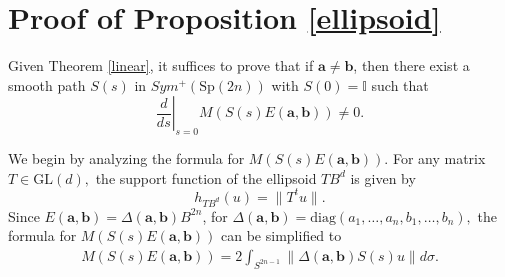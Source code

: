 \documentclass[12pt]{amsart}
\theoremstyle{definition}
\newcommand{\II}{{\mathbb I}}
\begin{document}
\section{Proof of Proposition \ref{ellipsoid}}\label{sec:ellipsoid}


Given Theorem \ref{linear}, it suffices to prove that if $\mathbf{a} \neq \mathbf{b}$, then there exist a smooth path $S(s)$ in $Sym^+(\mathrm{Sp}(2n))$ with $S(0) = \II$ such that $$\left.\frac{d}{ds}\right|_{s=0} M(S(s) E(\mathbf{a},\mathbf{b})) \neq 0.$$



We begin by analyzing the formula for $M(S(s) E(\mathbf{a},\mathbf{b}))$.
For any matrix $T \in \mathrm{GL}(d),$ the support function of the ellipsoid $TB^d$ is given by $$h_{TB^d}(u) = \|T^t u\|.$$ Since $E(\mathbf{a},\mathbf{b}) = \Delta(\mathbf{a}, \mathbf{b})B^{2n}$, for $\Delta(\mathbf{a}, \mathbf{b}) = \mathrm{diag}(a_1, \dots, a_n, b_1, \dots, b_n),$ the formula for $M(S(s) E(\mathbf{a},\mathbf{b}))$ can be simplified to 
\begin{align*}
   M(S(s) E(\mathbf{a},\mathbf{b}))  = 2\int_{S^{2n-1}} \|\Delta(\mathbf{a}, \mathbf{b}) S(s) u\| d\sigma.
\end{align*}
\end{document}
